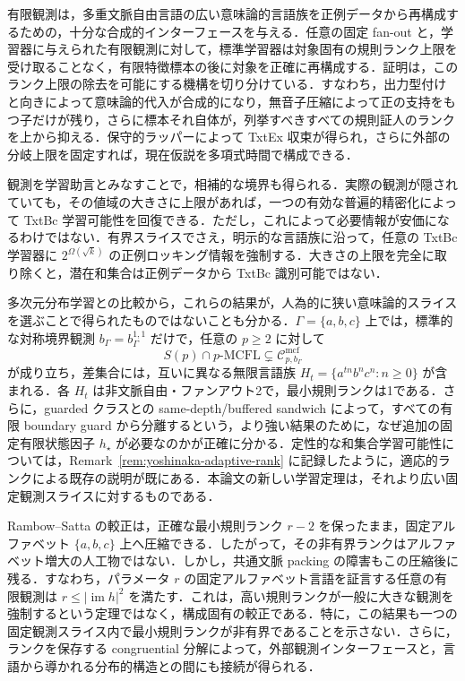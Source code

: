\documentclass[11pt,a4paper]{ltjsarticle}
\numberwithin{equation}{section}
\theoremstyle{plain}
\theoremstyle{definition}
\theoremstyle{remark}
\newcommand{\Cmcf}[2]{\mathcal{C}^{\mathrm{mcf}}_{#1,#2}}
\begin{document}
有限観測は，多重文脈自由言語の広い意味論的言語族を正例データから再構成するための，十分な合成的インターフェースを与える．任意の固定 fan-out と，学習器に与えられた有限観測に対して，標準学習器は対象固有の規則ランク上限を受け取ることなく，有限特徴標本の後に対象を正確に再構成する．証明は，このランク上限の除去を可能にする機構を切り分けている．すなわち，出力型付けと向きによって意味論的代入が合成的になり，無音子圧縮によって正の支持をもつ子だけが残り，さらに標本それ自体が，列挙すべきすべての規則証人のランクを上から抑える．保守的ラッパーによって TxtEx 収束が得られ，さらに外部の分岐上限を固定すれば，現在仮説を多項式時間で構成できる．

観測を学習助言とみなすことで，相補的な境界も得られる．実際の観測が隠されていても，その値域の大きさに上限があれば，一つの有効な普遍的精密化によって TxtBc 学習可能性を回復できる．ただし，これによって必要情報が安価になるわけではない．有界スライスでさえ，明示的な言語族に沿って，任意の TxtBc 学習器に $2^{\Omega(\sqrt{k})}$ の正例ロッキング情報を強制する．大きさの上限を完全に取り除くと，潜在和集合は正例データから TxtBc 識別可能ではない．

多次元分布学習との比較から，これらの結果が，人為的に狭い意味論的スライスを選ぶことで得られたものではないことも分かる．$\Gamma=\{a,b,c\}$ 上では，標準的な対称境界観測 $b_\Gamma=b_\Gamma^{1,1}$ だけで，任意の $p\ge2$ に対して
\[
  S(p)\cap p\text{-}\mathrm{MCFL}
  \subsetneq
  \Cmcf{p}{b_\Gamma}
\]
が成り立ち，差集合には，互いに異なる無限言語族
$H_t=\{a^{tn}b^nc^n:n\ge0\}$ が含まれる．各 $H_t$ は非文脈自由・ファンアウト2で，最小規則ランクは1である．さらに，guarded クラスとの same-depth/buffered sandwich によって，すべての有限 boundary guard から分離するという，より強い結果のために，なぜ追加の固定有限状態因子 $h_\star$ が必要なのかが正確に分かる．定性的な和集合学習可能性については，Remark~\ref{rem:yoshinaka-adaptive-rank} に記録したように，適応的ランクによる既存の説明が既にある．本論文の新しい学習定理は，それより広い固定観測スライスに対するものである．

Rambow--Satta の較正は，正確な最小規則ランク $r-2$ を保ったまま，固定アルファベット $\{a,b,c\}$ 上へ圧縮できる．したがって，その非有界ランクはアルファベット増大の人工物ではない．しかし，共通文脈 packing の障害もこの圧縮後に残る．すなわち，パラメータ $r$ の固定アルファベット言語を証言する任意の有限観測は $r\le|\operatorname{im}h|^2$ を満たす．これは，高い規則ランクが一般に大きな観測を強制するという定理ではなく，構成固有の較正である．特に，この結果も一つの固定観測スライス内で最小規則ランクが非有界であることを示さない．さらに，ランクを保存する congruential 分解によって，外部観測インターフェースと，言語から導かれる分布的構造との間にも接続が得られる．
\end{document}
